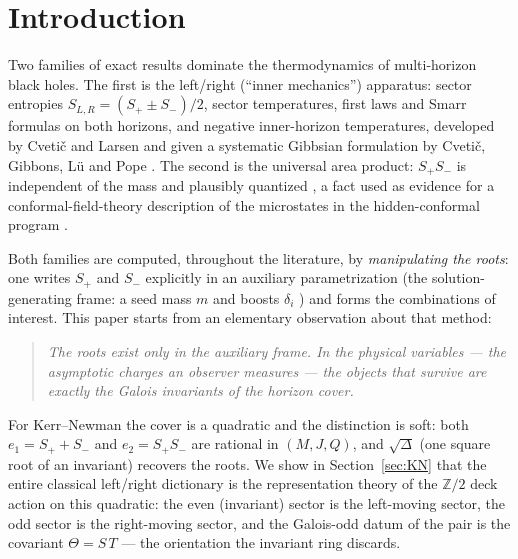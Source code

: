 \documentclass[11pt]{article}
\theoremstyle{definition}
\theoremstyle{remark}
\newcommand{\ZZ}{\mathbb{Z}}
\newcommand{\disc}{\Delta}
\begin{document}
\section{Introduction}

Two families of exact results dominate the thermodynamics of multi-horizon
black holes. The first is the left/right (``inner mechanics'') apparatus: sector
entropies $S_{L,R}=(S_+\pm S_-)/2$, sector temperatures, first laws and Smarr
formulas on both horizons, and negative inner-horizon temperatures, developed
by Cveti\v{c} and Larsen \cite{CL1,CL2} and given a systematic Gibbsian
formulation by Cveti\v{c}, Gibbons, L\"u and Pope \cite{CGLP2018}. The second
is the universal area product: $S_+S_-$ is independent of the mass and
plausibly quantized \cite{AH,CGP2011,CR2012}, a fact used as evidence for a
conformal-field-theory description of the microstates in the hidden-conformal
program \cite{CMS,WangLiu,ChenLong4Q}.

Both families are computed, throughout the literature, by \emph{manipulating
the roots}: one writes $S_+$ and $S_-$ explicitly in an auxiliary
parametrization (the solution-generating frame: a seed mass $m$ and boosts
$\delta_i$ \cite{CY,Std4Q}) and forms the combinations of interest. This paper
starts from an elementary observation about that method:

\begin{quote}
\emph{The roots exist only in the auxiliary frame. In the physical variables
--- the asymptotic charges an observer measures --- the objects that survive
are exactly the Galois invariants of the horizon cover.}
\end{quote}

For Kerr--Newman the cover is a quadratic and the distinction is soft: both
$e_1=S_++S_-$ and $e_2=S_+S_-$ are rational in $(M,J,Q)$, and $\sqrt{\disc}$
(one square root of an invariant) recovers the roots. We show in
Section~\ref{sec:KN} that the entire classical left/right dictionary is the
representation theory of the $\ZZ/2$ deck action on this quadratic: the even
(invariant) sector is the left-moving sector, the odd sector is the
right-moving sector, and the Galois-odd datum of the pair is the covariant
$\Theta=S\,T$ --- the orientation the invariant ring discards.
\end{document}
